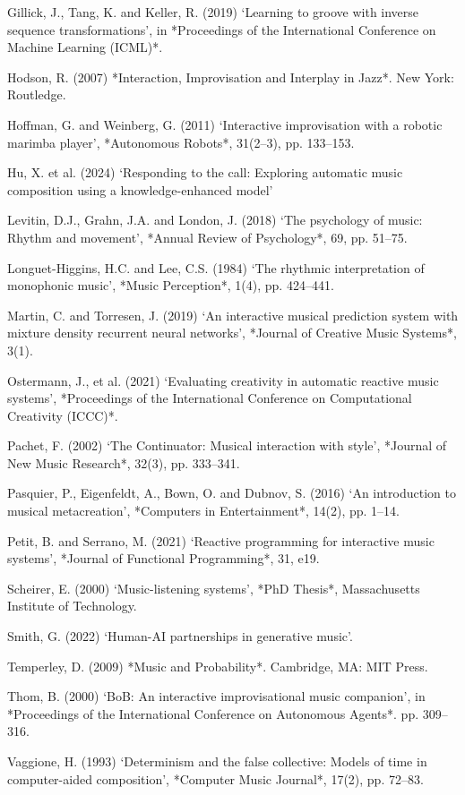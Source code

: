 Gillick, J., Tang, K. and Keller, R. (2019) `Learning to groove with
inverse sequence transformations', in *Proceedings of the International
Conference on Machine Learning (ICML)*.

Hodson, R. (2007) *Interaction, Improvisation and Interplay in Jazz*.
New York: Routledge.

Hoffman, G. and Weinberg, G. (2011) `Interactive improvisation with a
robotic marimba player', *Autonomous Robots*, 31(2--3), pp. 133--153.

Hu, X. et al. (2024) `Responding to the call: Exploring automatic music
composition using a knowledge-enhanced model'

Levitin, D.J., Grahn, J.A. and London, J. (2018) `The psychology of
music: Rhythm and movement', *Annual Review of Psychology*, 69, pp.
51--75.

Longuet-Higgins, H.C. and Lee, C.S. (1984) `The rhythmic interpretation
of monophonic music', *Music Perception*, 1(4), pp. 424--441.

Martin, C. and Torresen, J. (2019) `An interactive musical prediction
system with mixture density recurrent neural networks', *Journal of
Creative Music Systems*, 3(1).

Ostermann, J., et al. (2021) `Evaluating creativity in automatic
reactive music systems', *Proceedings of the International Conference on
Computational Creativity (ICCC)*.

Pachet, F. (2002) `The Continuator: Musical interaction with style',
*Journal of New Music Research*, 32(3), pp. 333--341.

Pasquier, P., Eigenfeldt, A., Bown, O. and Dubnov, S. (2016) `An
introduction to musical metacreation', *Computers in Entertainment*,
14(2), pp. 1--14.

Petit, B. and Serrano, M. (2021) `Reactive programming for interactive
music systems', *Journal of Functional Programming*, 31, e19.

Scheirer, E. (2000) `Music-listening systems', *PhD Thesis*,
Massachusetts Institute of Technology.

Smith, G. (2022) `Human-AI partnerships in generative music'.

Temperley, D. (2009) *Music and Probability*. Cambridge, MA: MIT Press.

Thom, B. (2000) `BoB: An interactive improvisational music companion',
in *Proceedings of the International Conference on Autonomous Agents*.
pp. 309--316.

Vaggione, H. (1993) `Determinism and the false collective: Models of
time in computer-aided composition', *Computer Music Journal*, 17(2),
pp. 72--83.
